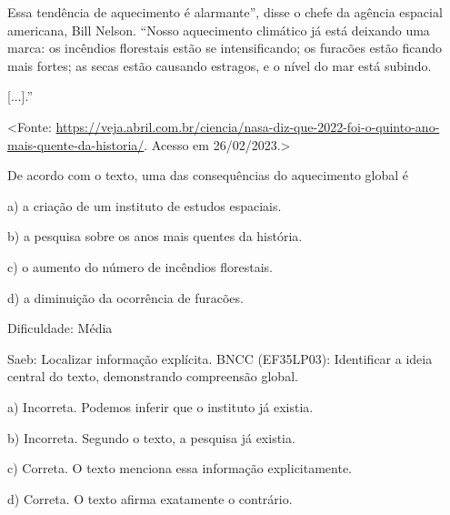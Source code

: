 Essa tendência de aquecimento é alarmante'', disse o chefe da agência
espacial americana, Bill Nelson. ``Nosso aquecimento climático já está
deixando uma marca: os incêndios florestais estão se intensificando; os
furacões estão ficando mais fortes; as secas estão causando estragos, e
o nível do mar está subindo.

{[}...{]}.''

\textless{}Fonte:
\url{https://veja.abril.com.br/ciencia/nasa-diz-que-2022-foi-o-quinto-ano-mais-quente-da-historia/}.
Acesso em 26/02/2023.\textgreater{}

De acordo com o texto, uma das consequências do aquecimento global é

a) a criação de um instituto de estudos espaciais.

b) a pesquisa sobre os anos mais quentes da história.

c) o aumento do número de incêndios florestais.

d) a diminuição da ocorrência de furacões.

Dificuldade: Média

Saeb: Localizar informação explícita. BNCC (EF35LP03): Identificar a
ideia central do texto, demonstrando compreensão global.

a) Incorreta. Podemos inferir que o instituto já existia.

b) Incorreta. Segundo o texto, a pesquisa já existia.

c) Correta. O texto menciona essa informação explicitamente.

d) Correta. O texto afirma exatamente o contrário.
